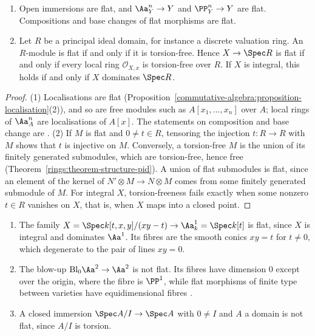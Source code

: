 \begin{proposition}\label{schemes:proposition-flat}
\begin{enumerate}
\item Open immersions are flat, and $\Aa^n_Y \to Y$ and $\PP^n_Y \to Y$ are flat. Compositions and base changes of flat morphisms are flat.
\item Let $R$ be a principal ideal domain, for instance a discrete valuation ring. An $R$-module is flat if and only if it is torsion-free. Hence
$X \to \Spec R$ is flat if and only if every local ring $\mathcal{O}_{X,x}$ is torsion-free over $R$. If $X$ is integral, this holds if and only if
$X$ dominates $\Spec R$.
\end{enumerate}
\end{proposition}

\begin{proof}
(1) Localisations are flat (Proposition~\ref{commutative-algebra:proposition-localisation}(2)), and so are free modules such as $A[x_1, \ldots, x_n]$ over $A$;
local rings of $\Aa^n_A$ are localisations of $A[x]$. The statements on composition and base change are \cite[Proposition III.9.2]{hartshorne-ag}.
(2) If $M$ is flat and $0 \neq t \in R$, tensoring the injection $t \colon R \to R$ with $M$ shows that $t$ is injective on $M$. Conversely, a torsion-free
$M$ is the union of its finitely generated submodules, which are torsion-free, hence free (Theorem~\ref{rings:theorem-structure-pid}). A union of flat
submodules is flat, since an element of the kernel of $N' \otimes M \to N \otimes M$ comes from some finitely generated submodule of $M$. For integral $X$,
torsion-freeness fails exactly when some nonzero $t \in R$ vanishes on $X$, that is, when $X$ maps into a closed point.
\end{proof}

\begin{example}\label{schemes:example-flat}
\begin{enumerate}
\item The family $X = \Spec k[t, x, y]/(xy - t) \to \Aa^1_k = \Spec k[t]$ is flat, since $X$ is integral and dominates $\Aa^1$. Its fibres are the smooth conics
$xy = t$ for $t \neq 0$, which degenerate to the pair of lines $xy = 0$.
\item The blow-up $\mathrm{Bl}_0\Aa^2 \to \Aa^2$ is not flat. Its fibres have dimension $0$ except over the origin, where the fibre is $\PP^1$, while flat morphisms
of finite type between varieties have equidimensional fibres \cite[Proposition III.9.5]{hartshorne-ag}.
\item A closed immersion $\Spec A/I \to \Spec A$ with $0 \neq I$ and $A$ a domain is not flat, since $A/I$ is torsion.
\end{enumerate}
\end{example}

